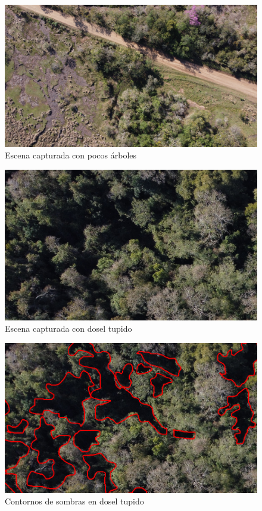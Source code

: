 \begin{figure}[H]
    \includegraphics[width=\textwidth]{Imagenes/street.jpg}
     \hfill
     \caption{Escena capturada con pocos árboles}
    \label{calle}
\end{figure}

\begin{figure}[H]
    \includegraphics[width=\textwidth]{Imagenes/dense canopy.jpg}
     \hfill
     \caption{Escena capturada con dosel tupido}
    \label{tupido}
\end{figure}


\begin{figure}[H]
    \includegraphics[width=\textwidth]{Imagenes/contours.png}
     \hfill
     \caption{Contornos de sombras en dosel tupido}
    \label{contorno1}
\end{figure}

